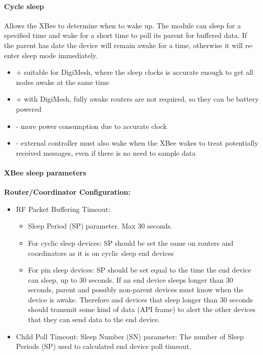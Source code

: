 \paragraph{Cycle sleep}
Allows the XBee to determine when to wake up. The module can sleep for a specified time and wake for a short time to poll its parent for buffered data. If the parent has date the device will remain awake for a time, otherwise it will re-enter sleep mode immediately. 
\begin{itemize}
\item + suitable for DigiMesh, where the sleep clocks is accurate enough to get all nodes awake at the same time
\item + with DigiMesh, fully awake routers are not required, so they can be battery powered
\item - more power consumption due to accurate clock
\item - external controller must also wake when the XBee wakes to treat potentially received messages, even if there is no need to sample data
\end{itemize}

\paragraph{XBee sleep parameters}
\textbf{Router/Coordinator Configuration:} 
\begin{itemize}
\item RF Packet Buffering Timeout: 
\begin{itemize}
\item Sleep Period (SP) parameter. Max 30 seconds.
\item For cyclic sleep devices: SP should be set the same on routers and coordinators as it is on cyclic sleep end devices
\item For pin sleep devices: SP should be set equal to the time the end device can sleep, up to 30 seconds. If an end device sleeps longer than 30 seconds, parent and possibly non-parent devices must know when the device is awake. Therefore and devices that sleep longer than 30 seconds should transmit some kind of data (API frame) to alert the other devices that they can send data to the end device.
\end{itemize}
\item Child Poll Timeout: Sleep Number (SN) parameter: The number of Sleep Periods (SP) used to calculated end device poll timeout.
\end{itemize}

